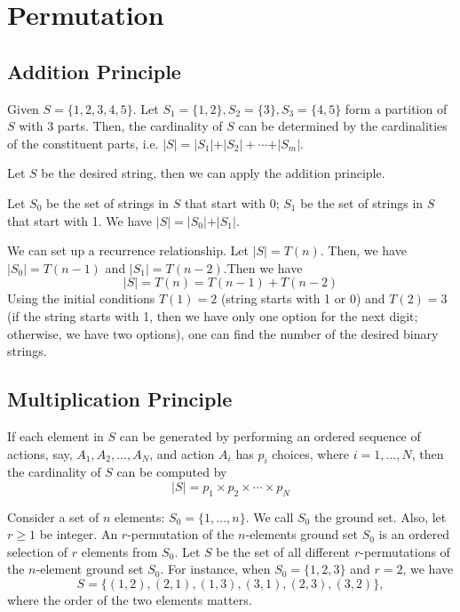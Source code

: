 \section{Permutation}
\subsection{Addition Principle}
Given \(S = \{1, 2, 3, 4, 5\}\). Let \(S_1 = \{1, 2\}, S_2 = \{3\}, S_3 = \{4, 5\}\) form a partition of \(S\) with 3 parts. Then, the cardinality of \(S\) can be determined by the cardinalities of the constituent parts, i.e. \(\vert S \vert = \vert S_1 \vert + \vert S_2 \vert + \cdots + \vert S_m \vert \).

\begin{eg}

    Let \(S\) be the desired string, then we can apply the addition principle.

    Let \(S_0\) be the set of strings in \(S\) that start with 0; \(S_1\) be the set of strings in \(S\) that start with 1. We have \(\vert S \vert = \vert S_0 \vert + \vert S_1 \vert\).

    We can set up a recurrence relationship. Let \(\vert S \vert = T(n)\). Then, we have \(\vert S_0 \vert = T(n - 1)\) and \(\vert S_1 \vert = T(n - 2)\).Then we have 
    \[
        \vert S \vert = T(n) = T(n - 1) + T(n - 2)
    \]
    Using the initial conditions \(T(1) = 2\) (string starts with 1 or 0) and \(T(2) = 3\) (if the string starts with 1, then we have only one option for the next digit; otherwise, we have two options), one can find the number of the desired binary strings. 
\end{eg}

\subsection{Multiplication Principle}
If each element in \(S\) can be generated by performing an ordered sequence of actions, say, \(A_1, A_2, \dots, A_N\), and action \(A_i\) has \(p_i\) choices, where \(i = 1, \dots, N\), then the cardinality of \(S\) can be computed by
\[
    \vert S \vert = p_1 \times p_2 \times \cdots \times p_N
\] 

\begin{eg}
    Consider a set of \(n\) elements: \(S_0 = \{1, \dots, n\}\). We call \(S_0\) the ground set. Also, let \(r \geq 1\) be integer. An \(r\)-permutation of the \(n\)-elements ground set \(S_0\) is an ordered selection of \(r\) elements from \(S_0\). Let \(S\) be the set of all different \(r\)-permutations of the \(n\)-element ground set \(S_0\). For instance, when \(S_0 = \{1, 2, 3\}\) and \(r = 2\), we have
    \[
        S = \{(1, 2), (2, 1), (1, 3), (3, 1), (2, 3), (3, 2)\},
    \]
    where the order of the two elements matters. 
\end{eg}

